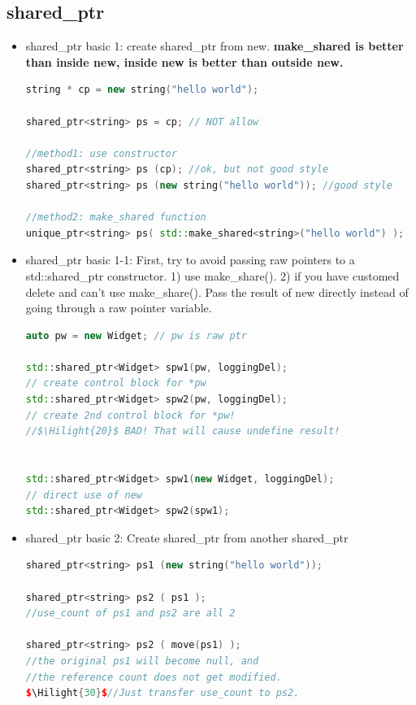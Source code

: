 \documentclass[a4paper,12pt,twoside]{book}
\newcommand{\Hilight}[1]{\makebox[0pt][l]{\color{yellow}\rule[-3pt]{#1em}{11pt}}}
\begin{document}
\subsection{shared\_ptr}
\begin{itemize}

\item shared\_ptr basic 1: create shared\_ptr from new. \textbf{make\_shared is better than inside new, inside new is better than outside new.}
\begin{lstlisting}[frame=single, language=c++]
string * cp = new string("hello world");

shared_ptr<string> ps = cp; // NOT allow

//method1: use constructor
shared_ptr<string> ps (cp); //ok, but not good style
shared_ptr<string> ps (new string("hello world")); //good style

//method2: make_shared function
unique_ptr<string> ps( std::make_shared<string>("hello world") );
\end{lstlisting}

\item shared\_ptr basic 1-1: First, try to
avoid passing raw pointers to a std::shared\_ptr constructor. 1) use make\_share(). 2) if you have customed delete and can't use make\_share().  Pass the result of new directly
instead of going through a raw pointer variable.

\begin{lstlisting}[frame=single, language=c++]
auto pw = new Widget; // pw is raw ptr

std::shared_ptr<Widget> spw1(pw, loggingDel);
// create control block for *pw
std::shared_ptr<Widget> spw2(pw, loggingDel);
// create 2nd control block for *pw!
//$\Hilight{20}$ BAD! That will cause undefine result!


std::shared_ptr<Widget> spw1(new Widget, loggingDel);
// direct use of new
std::shared_ptr<Widget> spw2(spw1);
\end{lstlisting}

\item shared\_ptr basic 2: Create shared\_ptr from another shared\_ptr
\begin{lstlisting}[frame=single, language=c++, mathescape=true]
shared_ptr<string> ps1 (new string("hello world"));

shared_ptr<string> ps2 ( ps1 );
//use_count of ps1 and ps2 are all 2

shared_ptr<string> ps2 ( move(ps1) );
//the original ps1 will become null, and
//the reference count does not get modified.
$\Hilight{30}$//Just transfer use_count to ps2. 
\end{lstlisting}


\end{itemize}
\end{document}
